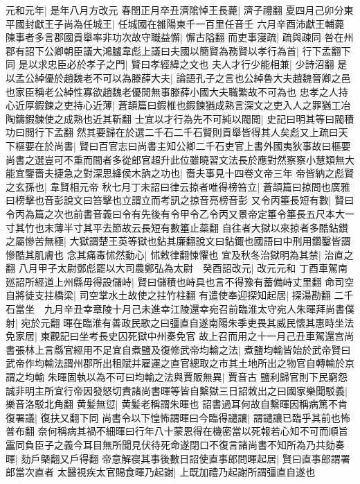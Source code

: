 元和元年|{
	是年八月方改元}
春閏正月卒丑濟隂悼王長薨|{
	濟子禮翻}
夏四月己卯分東平國封獻王子尚為任城王|{
	任城國在雒陽東千一百里任音壬}
六月辛酉沛獻王輔薨　陳事者多言郡國貢舉率非功次故守職益懈|{
	懈古隘翻}
而吏事寖疏|{
	疏與疎同}
咎在州郡有詔下公卿朝臣議大鴻臚韋彪上議曰夫國以簡賢為務賢以孝行為首|{
	行下孟翻下同}
是以求忠臣必於孝子之門|{
	賢曰孝經緯之文也}
夫人才行少能相兼|{
	少詩沼翻}
是以孟公綽優於趙魏老不可以為滕薛大夫|{
	論語孔子之言也公綽魯大夫趙魏晉卿之邑也家臣稱老公綽性寡欲趙魏老優閒無事滕薛小國大夫職繁故不可為也}
忠孝之人持心近厚鍜鍊之吏持心近薄|{
	蒼頡篇曰鍜椎也鍜鍊猶成熟言深文之吏入人之罪猶工冶陶鑄鍜鍊使之成熟也近其靳翻}
士宜以才行為先不可純以閥閲|{
	史記曰明其等曰閥積功曰閲行下孟翻}
然其要歸在於選二千石二千石賢則貢舉皆得其人矣彪又上疏曰天下樞要在於尚書|{
	賢曰百官志曰尚書主知公卿二千石吏官上書外國夷狄事故曰樞要}
尚書之選豈可不重而間者多從郎官超升此位雖曉習文法長於應對然察察小慧類無大能宜鑒嗇夫捷急之對深思絳侯木訥之功也|{
	嗇夫事見十四卷文帝三年}
帝皆納之彪賢之玄孫也|{
	韋賢相元帝}
秋七月丁未詔曰律云掠者唯得榜笞立|{
	蒼頡篇曰掠問也廣雅曰榜擊也音彭說文曰笞擊也立謂立而考訊之掠音亮榜音彭}
又令丙箠長短有數|{
	賢曰令丙為篇之次也前書音義曰令有先後有令甲令乙令丙又景帝定箠令箠長五尺本大一寸其竹也末薄半寸其平去節故云長短有數箠止蘂翻}
自往者大獄以來掠者多酷鉆鑚之屬慘苦無極|{
	大獄謂楚王英等獄也鉆其廉翻說文曰鉆鋷也國語曰中刑用鑽鑿皆謂慘酷其肌膚也}
念其痛毒怵然動心|{
	怵敕律翻悚懼也}
宜及秋冬治獄明為其禁|{
	治直之翻}
八月甲子太尉鄧彪罷以大司農鄭弘為太尉　癸酉詔改元|{
	改元元和}
丁酉車駕南廵詔所經道上州縣毋得設儲峙|{
	賢曰儲積也峙具也言不得豫有蓄備峙丈里翻}
命司空自將徒支拄橋梁|{
	司空掌水土故使之拄竹柱翻}
有遣使奉迎探知起居|{
	探湯勘翻}
二千石當坐　九月辛丑幸章陵十月己未進幸江陵還幸宛召前臨淮太守宛人朱暉拜尚書僕射|{
	宛於元翻}
暉在臨淮有善政民歌之曰彊直自遂南陽朱季吏畏其威民懷其惠時坐法免家居|{
	東觀記曰坐考長史囚死獄中州奏免官}
故上召而用之十一月己丑車駕還宫尚書張林上言縣官經用不足宜自煮鹽及復修武帝均輸之法|{
	煮鹽均輸皆始於武帝賢曰武帝作均輸法謂州郡所出租賦并雇運之直官總取之市其土地所出之物官自轉輸於京謂之均輸}
朱暉固執以為不可曰均輸之法與賈販無異|{
	賈音古}
鹽利歸官則下民窮怨誠非明主所宜行帝因發怒切責諸尚書暉等皆自繫獄三日詔敇出之曰國家樂聞駁義|{
	樂音洛駁北角翻}
黄髪無愆|{
	黄髪老稱謂朱暉也}
詔書過耳何故自繫暉因稱病篤不肯復署議|{
	復扶又翻下同}
尚書令以下惶怖謂暉曰今臨得譴讓|{
	謂譴讓已臨乎其前也怖普布翻}
奈何稱病其禍不細暉曰行年八十蒙恩得在機密當以死報若心知不可而順旨靁同負臣子之義今耳目無所聞見伏待死命遂閉口不復言諸尚書不知所為乃共劾奏暉|{
	劾戶槩翻又戶得翻}
帝意解寑其事後數日詔使直事郎問暉起居|{
	賢曰直事郎謂署郎當次直者}
太醫視疾太官賜食暉乃起謝|{
	上既加禮乃起謝所謂彊直自遂也}
